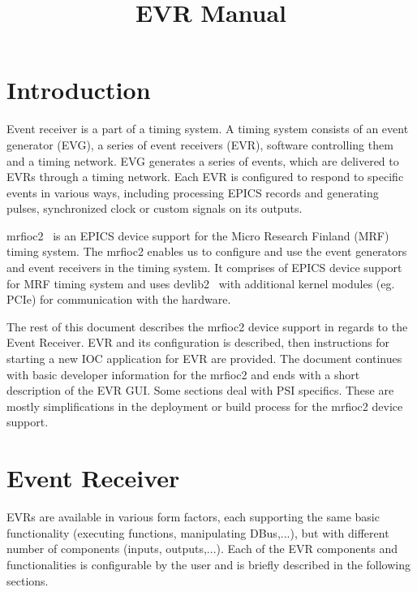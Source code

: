 \documentclass[12pt,a4paper]{article}
\title{EVR Manual}
\date{}
\let\stdsection\section
\renewcommand\section{\newpage\stdsection}
\begin{document}
\maketitle


\tableofcontents


\section{Introduction}\label{sec:Introduction}
Event receiver is a part of a timing system. A timing system consists of an event generator (EVG), a series of event receivers (EVR), software controlling them and a timing network. EVG generates a series of events, which are delivered to EVRs through a timing network. Each EVR is configured to respond to specific events in various ways, including processing EPICS records and generating pulses, synchronized clock or custom signals on its outputs.

mrfioc2~\cite{mrfioc2} is an EPICS device support for the Micro Research Finland (MRF)~\cite{mrf} timing system. The mrfioc2 enables us to configure and use the event generators and event receivers in the timing system. It comprises of EPICS device support for MRF timing system and uses devlib2~\cite{devlib2} with additional kernel modules (eg. PCIe) for communication with the hardware.

The rest of this document describes the mrfioc2 device support in regards to the Event Receiver. EVR and its configuration is described, then instructions for starting a new IOC application for EVR are provided. The document continues with basic developer information for the mrfioc2 and ends with a short description of the EVR GUI. Some sections deal with PSI specifics. These are mostly simplifications in the deployment or build process for the mrfioc2 device support.

\section{Event Receiver}\label{sec:Event Receiver}
EVRs are available in various form factors, each supporting the same basic functionality (executing functions, manipulating DBus,...), but with different number of components (inputs, outputs,...). Each of the EVR components and functionalities is configurable by the user and is briefly described in the following sections.
\end{document}
